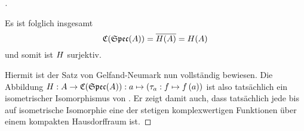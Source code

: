 \begin{proof}[]
\begin{itemize}
Es ist folglich insgesamt
	\[\mathfrak{C}(\mathfrak{Spec}(A)) = \overline{H(A)} = H(A)\]
und somit ist $H$ surjektiv.
\end{itemize}

Hiermit ist der Satz von Gelfand-Neumark nun vollständig bewiesen. Die Abbildung $H: A \to \mathfrak{C}(\mathfrak{Spec}(A)): a \mapsto \left(\tau_a: f \mapsto f\left(a\right)\right)$ ist also tatsächlich ein isometrischer Isomorphismus von \CAlgn. Er zeigt damit auch, dass tatsächlich jede \CAlg{} bis auf isometrische Isomorphie eine \CAlg{} der stetigen komplexwertigen Funktionen über einem kompakten Hausdorffraum ist.
\end{proof}